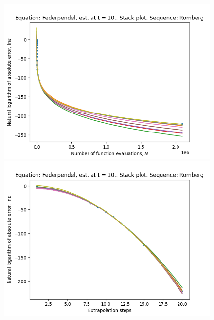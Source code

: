 \begin{figure}[H]
\centering
\begin{minipage}{0.45\textwidth}
\centering
\includegraphics[scale=0.45]{../results/emr_plots/federpendel_10_hp_romberg_stack.png}
\end{minipage}
\begin{minipage}{0.45\textwidth}
\centering
\includegraphics[scale=0.45]{../results/emr_plots/federpendel_10_hp_romberg_steps_stack.png}
\end{minipage}
\end{figure}

